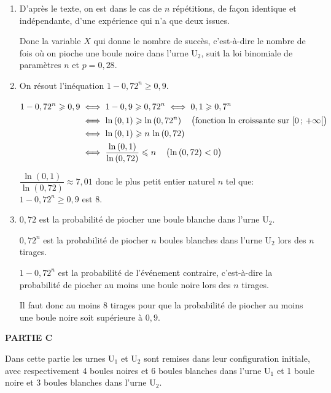 \begin{enumerate}
\item %
D'après le texte, on est dans le cas de $n$ répétitions,  de façon identique et indépendante, d'une expérience qui n'a que deux issues.

Donc la variable $X$ qui donne le nombre de succès, c'est-à-dire le nombre  de fois où on pioche une boule noire dans l'urne U$_2$, suit la loi binomiale de paramètres $n$ et $p= 0,28$.

\item %
On résout l'inéquation $1 - 0,72^n \geqslant 0,9.$

$\aligned[t]
1 - 0,72^n \geqslant 0,9
& \iff 1-0,9 \geqslant 0,72^n
\iff 0,1 \geqslant 0,7^n\\
& \iff \ln\left (0,1\right ) \geqslant \ln \left ( 0,72^n\right ) \quad \left (\text{fonction ln croissante sur }[0\,;\,+\infty[\strut\right )\\
& \iff \ln\left (0,1\right ) \geqslant n\,\ln \left ( 0,72\right )\\
& \iff \dfrac{\ln\left (0,1\right )}{\ln \left ( 0,72\right )} \leqslant n \quad \left (\ln\left (0,72\right )<0\strut\right )
\endaligned$

$ \dfrac{\ln\left (0,1\right )}{\ln \left ( 0,72\right )} \approx 7,01$ donc le plus petit entier naturel $n$ tel que:  $1 - 0,72^n \geqslant 0,9$ est 8.

\item%
$0,72$ est la probabilité de piocher une boule blanche dans l'urne U$_2$.

$0,72^n$ est la probabilité de piocher $n$ boules blanches dans l'urne U$_2$ lors des $n$ tirages.

$1-0,72^n$ est la probabilité de l'événement contraire, c'est-à-dire la probabilité de piocher au moins une boule noire lors des $n$ tirages.

Il faut donc au moins 8 tirages pour que la probabilité de piocher au moins une boule noire soit supérieure à $0,9$.

\end{enumerate}

\bigskip

\textbf{PARTIE C}

\medskip

Dans cette partie les urnes U$_1$ et U$_2$ sont remises dans leur configuration initiale, avec respectivement 4 boules noires et 6 boules blanches dans l'urne U$_1$ et 1 boule noire et 3 boules blanches dans l'urne U$_2$.

